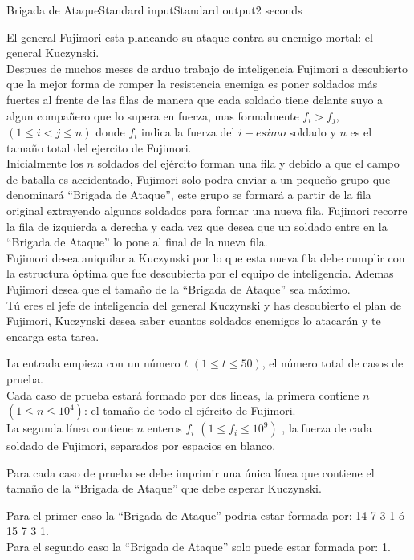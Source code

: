 \begin{problem}{Brigada de Ataque}{Standard input}{Standard output}{2 seconds}


El general Fujimori esta planeando su ataque contra su enemigo mortal: el general Kuczynski.\\
Despues de muchos meses de arduo trabajo de inteligencia Fujimori a descubierto que la mejor forma de romper la resistencia enemiga es poner soldados más fuertes al frente de las filas de manera que cada soldado tiene delante suyo a algun compañero que lo supera en fuerza,  mas formalmente $f_{i} > f_{j}$, $(1 \leq i < j \leq n)$ donde $f_{i}$ indica la fuerza del $i-esimo$ soldado y $n$ es el tamaño total del ejercito de Fujimori.\\
Inicialmente los $n$ soldados del ejército forman una fila y debido a que el campo de batalla es accidentado, Fujimori solo podra enviar a un pequeño grupo que denominará ``Brigada de Ataque'', este grupo se formará a partir de la fila original extrayendo algunos soldados para formar una nueva fila, Fujimori recorre la fila de izquierda a derecha y cada vez que desea que un soldado entre en la ``Brigada de Ataque'' lo pone al final de la nueva fila.\\
Fujimori desea aniquilar a Kuczynski por lo que esta nueva fila debe cumplir con la estructura óptima que fue descubierta por el equipo de inteligencia. Ademas Fujimori desea que el tamaño de la ``Brigada de Ataque'' sea máximo.\\
Tú eres el jefe de inteligencia del general Kuczynski y has descubierto el plan de Fujimori, Kuczynski desea saber cuantos soldados enemigos lo atacarán y te encarga esta tarea.

\InputFile
La entrada empieza con un número $t$ $(1\leq t \leq 50)$, el número total de casos de prueba.\\
Cada caso de prueba estará formado por dos lineas, la primera contiene $n$ $(1\leq n \leq 10^{4})$: el tamaño de todo el ejército de Fujimori.\\
La segunda línea contiene $n$ enteros $f_{i}$ $(1 \leq f_{i} \leq 10^{9})$ , la fuerza de cada soldado de Fujimori, separados por espacios en blanco.

\OutputFile
Para cada caso de prueba se debe imprimir una única línea que contiene el tamaño de la ``Brigada de Ataque'' que debe esperar Kuczynski.

\Example

\begin{example}
\end{example}

Para el primer caso la ``Brigada de Ataque'' podria estar formada por: 14 7 3 1 ó 15 7 3 1.\\
Para el segundo caso la ``Brigada de Ataque'' solo puede estar formada por: 1.
\end{problem}
